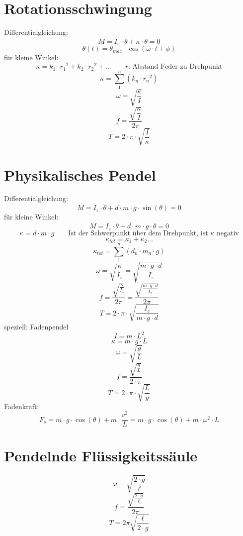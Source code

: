 \section{Rotationsschwingung}
Differentialgleichung: 
\[ \boxed{M = I_s \cdot \ddot{\theta} + \kappa \cdot \theta = 0} \]
\[ \boxed{\theta(t) = \theta_{max} \cdot \cos(\omega \cdot t + \phi)} \]
für kleine Winkel: 
\[ \boxed{\kappa = k_1 \cdot {r_1}^2 + k_2 \cdot {r_2}^2 + \dots } \qquad 
\text{$r$: Abstand Feder zu Drehpunkt} \]
\[ \boxed{\kappa = \sum_{1}^{n} \left(k_n \cdot {r_n}^2\right)} \]
\[ \boxed{\omega = \sqrt{\frac{\kappa}{I}}} \]
\[ \boxed{f = \frac{\sqrt{\dfrac{\kappa}{I}}}{2 \pi}} \]
\[ \boxed{T = 2 \cdot \pi \cdot \sqrt{\frac{I}{\kappa}}} \]

\section{Physikalisches Pendel}
Differentialgleichung: 
\[ \boxed{M = I_z \cdot \ddot{\theta} + d \cdot m \cdot g \cdot \sin(\theta) = 0} \]
für kleine Winkel: 
\[ \boxed{M = I_z \cdot \ddot{\theta} + d \cdot m \cdot g \cdot \theta = 0} \]
\[ \boxed{\kappa = d \cdot m \cdot g} \qquad 
\text{Ist der Schwerpunkt über dem Drehpunkt, ist $\kappa$ negativ} \]
\[ \boxed{\kappa_{tot} = \kappa_1 + \kappa_2 \dots} \]
\[ \boxed{\kappa_{tot} = \sum_{1}^{n} \left(d_n \cdot m_n \cdot g\right) } \]
\[ \boxed{\omega = \sqrt{\frac{\kappa}{I_z}} 
= \sqrt{\frac{m \cdot g \cdot d}{I_z}}} \]
\[ \boxed{f = \frac{\sqrt{\frac{\kappa}{I_z}}}{2 \pi}
= \frac{\sqrt{\frac{m \cdot g \cdot d}{I_z}}}{2 \pi}} \]
\[ \boxed{T = 2 \cdot \pi \cdot \sqrt{\frac{I_z}{m \cdot g \cdot d}}} \]
speziell: Fadenpendel
\[ \boxed{I = m \cdot L^2} \]
\[ \boxed{\kappa = m \cdot g \cdot L} \]
\[ \boxed{\omega = \sqrt{\frac{g}{L}}} \]
\[ \boxed{f = \frac{\sqrt{\frac{g}{L}}}{2 \cdot \pi}} \]
\[ \boxed{T = 2 \cdot \pi \cdot \sqrt{\frac{L}{g}}} \]
Fadenkraft: 
\[ \boxed{F_s = m \cdot g \cdot \cos(\theta) + m \cdot \frac{v^2}{L} 
= m \cdot g \cdot \cos(\theta) + m \cdot \omega^2 \cdot L} \]

\section{Pendelnde Flüssigkeitssäule}
\[ \boxed{\omega = \sqrt{\frac{2 \cdot g}{\ell}}} \]
\[ \boxed{f = \frac{\sqrt{\frac{2 \cdot g}{\ell}}}{2 \pi}} \]
\[ \boxed{T = 2 \pi \sqrt{\frac{\ell}{2 \cdot g}}} \]


